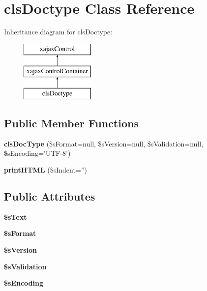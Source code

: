 \hypertarget{classclsDoctype}{
\section{clsDoctype Class Reference}
\label{classclsDoctype}
}
Inheritance diagram for clsDoctype:\begin{figure}[H]
\begin{center}
\leavevmode
\includegraphics[height=3.000000cm]{classclsDoctype}
\end{center}
\end{figure}
\subsection*{Public Member Functions}
\begin{DoxyCompactItemize}
\item 
\hypertarget{classclsDoctype_a27e599976c2dda621846304a40b09f7f}{
{\bfseries clsDocType} (\$sFormat=null, \$sVersion=null, \$sValidation=null, \$sEncoding='UTF-\/8')}
\label{classclsDoctype_a27e599976c2dda621846304a40b09f7f}

\item 
\hypertarget{classclsDoctype_a0fcca7ea088614edd05d33c005ab3e89}{
{\bfseries printHTML} (\$sIndent='')}
\label{classclsDoctype_a0fcca7ea088614edd05d33c005ab3e89}

\end{DoxyCompactItemize}
\subsection*{Public Attributes}
\begin{DoxyCompactItemize}
\item 
\hypertarget{classclsDoctype_a47d587cd2523b4e4360f922be0f74a0d}{
{\bfseries \$sText}}
\label{classclsDoctype_a47d587cd2523b4e4360f922be0f74a0d}

\item 
\hypertarget{classclsDoctype_a80d1dff016b2d7ebd24fcc5803ab8090}{
{\bfseries \$sFormat}}
\label{classclsDoctype_a80d1dff016b2d7ebd24fcc5803ab8090}

\item 
\hypertarget{classclsDoctype_a6759e4615d4062ecbdeac76d0ff7032f}{
{\bfseries \$sVersion}}
\label{classclsDoctype_a6759e4615d4062ecbdeac76d0ff7032f}

\item 
\hypertarget{classclsDoctype_accc48bd77429ca2008389b3f12dec199}{
{\bfseries \$sValidation}}
\label{classclsDoctype_accc48bd77429ca2008389b3f12dec199}

\item 
\hypertarget{classclsDoctype_aaa9ecedebec197f86356f954e4331437}{
{\bfseries \$sEncoding}}
\label{classclsDoctype_aaa9ecedebec197f86356f954e4331437}

\end{DoxyCompactItemize}


